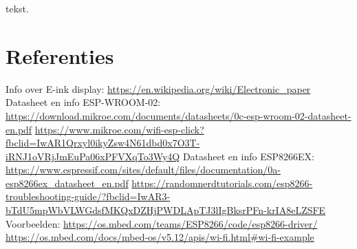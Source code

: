 \documentclass[a4paper,kul]{kulakarticle} %
\begin{document}
tekst.

\newpage

\section{Referenties}

Info over E-ink display:
\newline
\url{https://en.wikipedia.org/wiki/Electronic_paper}
\newline
\newline
Datasheet en info ESP-WROOM-02:
\newline
\url{https://download.mikroe.com/documents/datasheets/0c-esp-wroom-02-datasheet-en.pdf}
\newline
\url{https://www.mikroe.com/wifi-esp-click?fbclid=IwAR1Qrxyl0ikyZsw4N61dbd0x7O3T-iRNJ1oVRjJmEuPa06xPFVXqTo3Wy4Q}
\newline
\newline
Datasheet en info ESP8266EX:
\newline
\url{https://www.espressif.com/sites/default/files/documentation/0a-esp8266ex_datasheet_en.pdf}
\newline
\url{https://randomnerdtutorials.com/esp8266-troubleshooting-guide/?fbclid=IwAR3-bTdU5mpWbVLWGdsfMKQxDZHjPWDLApTJ3lIgBksrPFn-krIA8eLZSFE}
\newline
\newline
Voorbeelden:
\newline
\url{https://os.mbed.com/teams/ESP8266/code/esp8266-driver/}
\newline
\url{https://os.mbed.com/docs/mbed-os/v5.12/apis/wi-fi.html#wi-fi-example}
\end{document}
